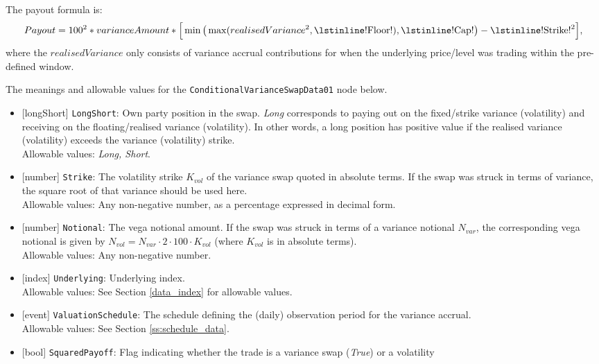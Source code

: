 The payout formula is:
\begin{equation*}
  Payout = 100^2 * varianceAmount * \Big[ \min \big( \max (realisedVariance^2, \text{\lstinline!Floor!}), \text{\lstinline!Cap!}\big) - \text{\lstinline!Strike!}^2 \Big],
\end{equation*}
where the $realisedVariance$ only consists of variance accrual contributions for when the underlying price/level
was trading within the pre-defined window.

The meanings and allowable values for the \lstinline!ConditionalVarianceSwapData01! node below.

\begin{itemize}
  \item{}[longShort] \lstinline!LongShort!: Own party position in the swap. \emph{Long} corresponds to paying out on the
  fixed/strike variance (volatility) and receiving on the floating/realised variance (volatility). In other words,
  a long position has positive value if the realised variance (volatility) exceeds the variance (volatility)
  strike. \\
  Allowable values: \emph{Long, Short}.
  \item{}[number] \lstinline!Strike!: The volatility strike $K_{vol}$ of the variance swap quoted in absolute terms.
  If the swap was struck in terms of variance, the square root of that variance should be used here. \\
  Allowable values: Any non-negative number, as a percentage expressed in decimal form.
  \item{}[number] \lstinline!Notional!: The vega notional amount. If the swap was struck in terms of a variance notional
  $N_{var}$, the corresponding vega notional is given by $N_{vol} = N_{var} \cdot 2 \cdot 100 \cdot K_{vol}$ (where
  $K_{vol}$ is in absolute terms). \\
  Allowable values: Any non-negative number.
  \item{}[index] \lstinline!Underlying!: Underlying index. \\
  Allowable values: See Section \ref{data_index} for allowable values.
  \item{}[event] \lstinline!ValuationSchedule!: The schedule defining the (daily) observation period for the variance accrual. \\
  Allowable values: See Section \ref{ss:schedule_data}.
  \item{}[bool] \lstinline!SquaredPayoff!: Flag indicating whether the trade is a variance swap (\emph{True}) or a volatility

\end{itemize}
